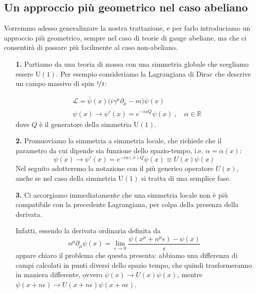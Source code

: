 \documentclass[../main.tex]{subfiles}
\begin{document}
\subsection[Approccio geometrico al caso abeliano]{Un approccio più geometrico nel caso abeliano}
Vorremmo adesso generalizzare la nostra trattazione, e per farlo introduciamo un approccio più geometrico, sempre nel caso di teorie di gauge abeliane, ma che ci consentirà di passare più facilmente al caso non-abeliano.
\begin{enumerate}
    \item[\textbf{1.}]  Partiamo da una teoria di massa con una simmetria globale che scegliamo essere $\textrm{U}(1)$. Per esempio consideriamo la Lagrangiana di Dirac che descrive un campo massivo di spin $\nicefrac{1}{2}$:
    
    \begin{align*}
        &\mathscr{L} = \bar\psi(x)\big(i\gamma^\mu\partial_\mu - m\big)\psi(x)\\
        &\psi(x) \rightarrow \psi'(x) = e^{-i\alpha Q}\psi(x)~,\quad \alpha\in\mathbb R
    \end{align*}
    dove $Q$ è il generatore della simmetria $\textrm{U}(1)$. 

    \item[\textbf{2.}] Promuoviamo la simmetria a simmetria locale, che richiede che il parametro da cui dipende sia funzione dello spazio-tempo, i.e. $\alpha = \alpha(x)$:
    \[
    \psi(x) \rightarrow \psi'(x) = e^{-i\alpha(x) Q}\psi(x) \equiv U(x)\psi(x)
    \]
    Nel seguito adotteremo la notazione con il più generico operatore $U(x)$, anche se nel caso della simmetria $\textrm{U}(1)$ si tratta di una semplice fase.
    
    \item[\textbf{3.}] Ci accorgiamo immediatamente che una simmetria locale non è più compatibile con la precedente Lagrangiana, per colpa della presenza della derivata.
    
    Infatti, essendo la derivata ordinaria definita da
    \[
    n^\mu\partial_\mu\psi(x) = \lim_{\epsilon\rightarrow0} \frac{\psi(x^\mu + n^\mu\epsilon) - \psi(x)}{\epsilon}
    \]
    appare chiaro il problema che questa presenta: abbiamo una differenza di campi calcolati in punti diversi dello spazio tempo, che quindi trasformeranno in maniera differente, ovvero $\psi(x) \rightarrow U(x)\psi(x)$, mentre $\psi(x + n\epsilon) \rightarrow U(x + n\epsilon)\psi(x + n\epsilon)$.


\end{enumerate}
\end{document}
